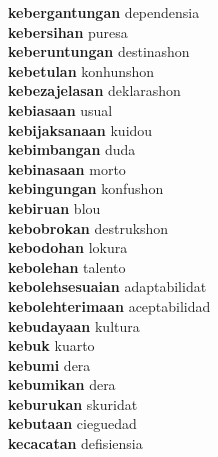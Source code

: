 \textbf{kebergantungan } dependensia \\
\textbf{kebersihan } puresa \\
\textbf{keberuntungan } destinashon \\
\textbf{kebetulan } konhunshon \\
\textbf{kebezajelasan } deklarashon \\
\textbf{kebiasaan } usual \\
\textbf{kebijaksanaan } kuidou \\
\textbf{kebimbangan } duda \\
\textbf{kebinasaan } morto \\
\textbf{kebingungan } konfushon \\
\textbf{kebiruan } blou \\
\textbf{kebobrokan } destrukshon \\
\textbf{kebodohan } lokura \\
\textbf{kebolehan } talento \\
\textbf{kebolehsesuaian } adaptabilidat \\
\textbf{kebolehterimaan } aceptabilidad \\
\textbf{kebudayaan } kultura \\
\textbf{kebuk } kuarto \\
\textbf{kebumi } dera \\
\textbf{kebumikan } dera \\
\textbf{keburukan } skuridat \\
\textbf{kebutaan } cieguedad \\
\textbf{kecacatan } defisiensia \\
